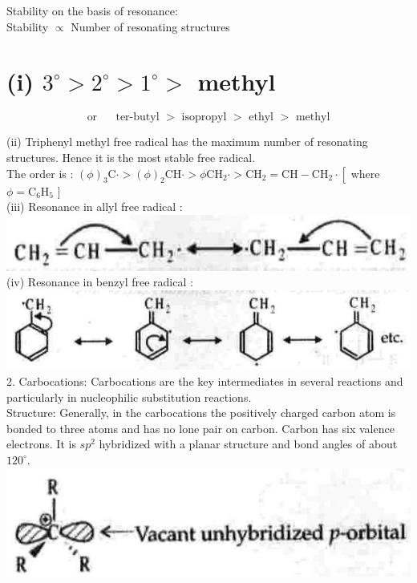 \documentclass[10pt]{article}
\begin{document}
Stability on the basis of resonance:\\
Stability $\propto$ Number of resonating structures

\section*{(i) $3^{\circ}>2^{\circ}>1^{\circ}>$ methyl}
$$
\text { or } \quad \text { ter-butyl }>\text { isopropyl }>\text { ethyl }>\text { methyl }
$$

(ii) Triphenyl methyl free radical has the maximum number of resonating structures. Hence it is the most stable free radical.\\
The order is : $(\phi)_{3} \mathrm{C} \cdot>(\phi)_{2} \mathrm{CH} \cdot>\phi \mathrm{CH}_{2} \cdot>\mathrm{CH}_{2}=\mathrm{CH}-\mathrm{CH}_{2} \cdot\left[\right.$ where $\phi=\mathrm{C}_{6} \mathrm{H}_{5}$ ]\\
(iii) Resonance in allyl free radical :\\
\includegraphics[max width=\textwidth, center]{2025_01_28_8470952b98110cec3aabg-085}\\
(iv) Resonance in benzyl free radical :\\
\includegraphics[max width=\textwidth, center]{2025_01_28_8470952b98110cec3aabg-085(2)}\\
2. Carbocations: Carbocations are the key intermediates in several reactions and particularly in nucleophilic substitution reactions.\\
Structure: Generally, in the carbocations the positively charged carbon atom is bonded to three atoms and has no lone pair on carbon. Carbon has six valence electrons. It is $s p^{2}$ hybridized with a planar structure and bond angles of about $120^{\circ}$.\\
\includegraphics[max width=\textwidth, center]{2025_01_28_8470952b98110cec3aabg-085(1)}
\end{document}
